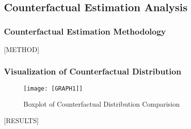 \subsection{Counterfactual Estimation Analysis}

\subsubsection{Counterfactual Estimation Methodology}

[METHOD]

\subsubsection{Visualization of Counterfactual Distribution}

\begin{figure}[H]
    \centering
    \texttt{[image: [GRAPH1]]}
    \caption{Boxplot of Counterfactual Distribution Comparision}
\end{figure}

[RESULTS]

